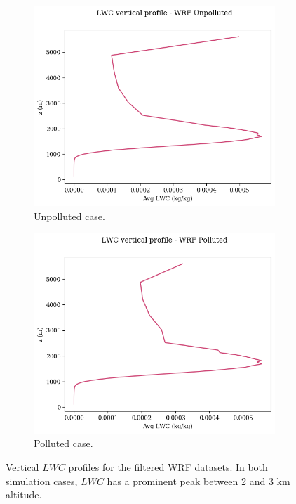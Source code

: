 \documentclass{article}
\begin{document}
\begin{figure}[ht]
	\centering
	\begin{subfigure}{1\textwidth}
		\includegraphics[width=\textwidth]{revmywrf/v1_lwc_vs_z_Unpolluted_figure.png}
		\caption{Unpolluted case.}
		\label{lwcprofunpoll}
	\end{subfigure}
	\begin{subfigure}{1\textwidth}
		\includegraphics[width=\textwidth]{revmywrf/v1_lwc_vs_z_Polluted_figure.png}
		\caption{Polluted case.}
		\label{lwcprofpoll}
	\end{subfigure}
	\caption{Vertical $LWC$ profiles for the filtered WRF datasets. In both simulation cases, $LWC$ has a prominent peak between 2 and 3 km altitude.}
	\label{lwcprof}
\end{figure}
\end{document}
